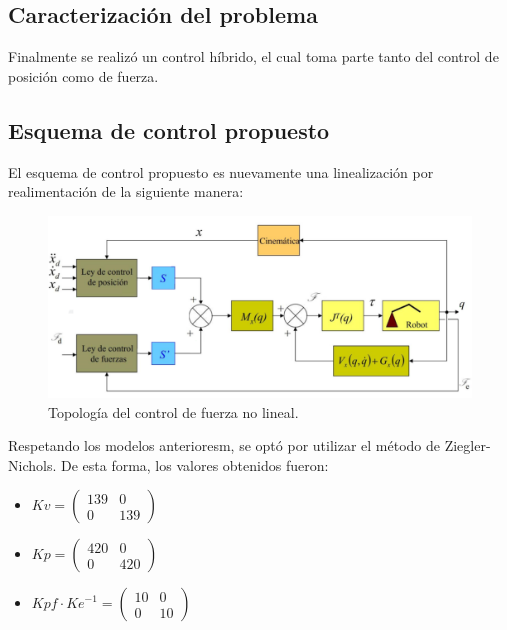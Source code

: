 %

%

\subsection{Caracterización del problema}
Finalmente se realizó un control híbrido, el cual toma parte tanto del control de posición como de fuerza.

\subsection{Esquema de control propuesto}
El esquema de control propuesto es nuevamente una linealización por realimentación de la siguiente manera:
\begin{figure}[H]
	\centering
	\includegraphics[width=0.8\linewidth]{ImagenesControl híbrido no lineal/controlh}
	\caption{Topología del control de fuerza no lineal.}	
	\label{fig:control_f_modelo_h}
\end{figure}


Respetando los modelos anterioresm, se optó por utilizar el método de Ziegler-Nichols. De esta forma, los valores obtenidos fueron:
\begin{multicols}{3}
\begin{itemize}
	\item $Kv = \begin{pmatrix}
	139 & 0 \\
	0 & 139
	\end{pmatrix}$
	\item $Kp = \begin{pmatrix}
	420 & 0 \\
	0 & 420
	\end{pmatrix}$
	\item $Kpf \cdot {Ke}^{-1} = \begin{pmatrix}
	10 & 0 \\
	0 & 10
	\end{pmatrix}$
\end{itemize}
\end{multicols}

